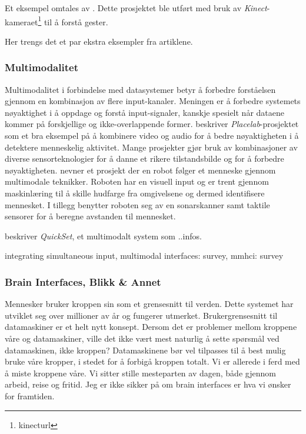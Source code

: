 Et eksempel omtales av \citet{homeos}. Dette prosjektet ble utført med bruk av \emph{Kinect}-kameraet\footnote{kinecturl} til å forstå gester.

{\color{red}Her trengs det et par ekstra eksempler fra artiklene.}

\subsubsection*{Multimodalitet}
Multimodalitet i forbindelse med datasystemer betyr å forbedre forståelsen gjennom en kombinasjon av flere input-kanaler. Meningen er å forbedre systemets nøyaktighet i å oppdage og forstå input-signaler, kanskje spesielt når dataene kommer på forskjellige og ikke-overlappende former. \citet{placelab05} beskriver \emph{Placelab}-prosjektet som et bra eksempel på å kombinere video og audio for å bedre nøyaktigheten i å detektere menneskelig aktivitet. Mange prosjekter gjør bruk av kombinasjoner av diverse sensorteknologier for å danne et rikere tilstandsbilde og for å forbedre nøyaktigheten. \citet{desilva12} nevner et prosjekt der en robot følger et menneske gjennom multimodale teknikker. Roboten har en visuell input og er trent gjennom maskinlæring til å skille hudfarge fra omgivelsene og dermed identifisere mennesket. I tillegg benytter roboten seg av en sonarskanner samt taktile sensorer for å beregne avstanden til mennesket.

\citet{quickset97} beskriver \emph{QuickSet}, et multimodalt system som ..{\color{red}infos}.

{\color{red}integrating simultaneous input, multimodal interfaces: survey, mmhci: survey}

\subsubsection*{Brain Interfaces, Blikk \& Annet}
Mennesker bruker kroppen sin som et grensesnitt til verden. Dette systemet har utviklet seg over millioner av år og fungerer utmerket. Brukergrensesnitt til datamaskiner er et helt nytt konsept. Dersom det er problemer mellom kroppene våre og datamaskiner, ville det ikke vært mest naturlig å sette spørsmål ved datamaskinen, ikke kroppen? Datamaskinene bør vel tilpasses til å best mulig bruke våre kropper, i stedet for å forbigå kroppen totalt. Vi er allerede i ferd med å miste kroppene våre. Vi sitter stille mesteparten av dagen, både gjennom arbeid, reise og fritid. Jeg er ikke sikker på om brain interfaces er hva vi ønsker for framtiden.

